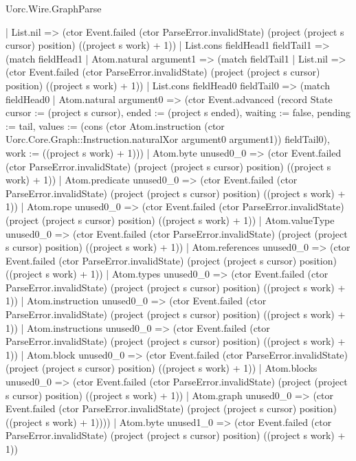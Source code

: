 \begin{lexlean}{Uorc.Wire.GraphParse}
\begin{semanticmodule}
{        | List.nil => (ctor Event.failed (ctor ParseError.invalidState) (project (project s cursor) position) ((project s work) + 1))
        | List.cons fieldHead1 fieldTail1 => (match fieldHead1
          | Atom.natural argument1 => (match fieldTail1
            | List.nil => (ctor Event.failed (ctor ParseError.invalidState) (project (project s cursor) position) ((project s work) + 1))
            | List.cons fieldHead0 fieldTail0 => (match fieldHead0
              | Atom.natural argument0 => (ctor Event.advanced (record State {cursor := (project s cursor), ended := (project s ended), waiting := false, pending := tail, values := (cons (ctor Atom.instruction (ctor Uorc.Core.Graph::Instruction.naturalXor argument0 argument1)) fieldTail0), work := ((project s work) + 1)}))
              | Atom.byte unused0_0 => (ctor Event.failed (ctor ParseError.invalidState) (project (project s cursor) position) ((project s work) + 1))
              | Atom.predicate unused0_0 => (ctor Event.failed (ctor ParseError.invalidState) (project (project s cursor) position) ((project s work) + 1))
              | Atom.rope unused0_0 => (ctor Event.failed (ctor ParseError.invalidState) (project (project s cursor) position) ((project s work) + 1))
              | Atom.valueType unused0_0 => (ctor Event.failed (ctor ParseError.invalidState) (project (project s cursor) position) ((project s work) + 1))
              | Atom.references unused0_0 => (ctor Event.failed (ctor ParseError.invalidState) (project (project s cursor) position) ((project s work) + 1))
              | Atom.types unused0_0 => (ctor Event.failed (ctor ParseError.invalidState) (project (project s cursor) position) ((project s work) + 1))
              | Atom.instruction unused0_0 => (ctor Event.failed (ctor ParseError.invalidState) (project (project s cursor) position) ((project s work) + 1))
              | Atom.instructions unused0_0 => (ctor Event.failed (ctor ParseError.invalidState) (project (project s cursor) position) ((project s work) + 1))
              | Atom.block unused0_0 => (ctor Event.failed (ctor ParseError.invalidState) (project (project s cursor) position) ((project s work) + 1))
              | Atom.blocks unused0_0 => (ctor Event.failed (ctor ParseError.invalidState) (project (project s cursor) position) ((project s work) + 1))
              | Atom.graph unused0_0 => (ctor Event.failed (ctor ParseError.invalidState) (project (project s cursor) position) ((project s work) + 1))))
          | Atom.byte unused1_0 => (ctor Event.failed (ctor ParseError.invalidState) (project (project s cursor) position) ((project s work) + 1))
}
\end{semanticmodule}
\end{lexlean}
